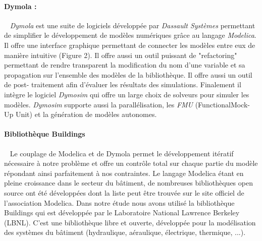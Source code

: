 \paragraph{Dymola :} %
\label{par:dymola}
~
\textit{Dymola} est une suite de logiciels développée par \textit{Dassault Systèmes} permettant de
simplifier le développement de modèles numériques grâce au langage \textit{Modelica}. Il offre une
interface graphique permettant de connecter les modèles entre eux de manière intuitive
(Figure 2). Il offre aussi un outil puissant de "refactoring" permettant de rendre
transparent la modification du nom d’une variable et sa propagation sur l’ensemble
des modèles de la bibliothèque. Il offre aussi un outil de post-
traitement afin d’évaluer les résultats des simulations. Finalement il intègre le logiciel
\textit{Dymosim} qui offre un large choix de solveurs pour simuler les modèles. \textit{Dymosim} supporte
aussi la parallélisation, les \emph{FMU} (FunctionalMock-Up Unit) et la génération de modèles
autonomes.

\paragraph{Bibliothèque Buildings} %
\label{par:bibliotheque_buildings}
~
Le couplage de Modelica et de Dymola permet le développement itératif nécessaire à notre
problème et offre un contrôle total sur chaque partie du modèle répondant ainsi
parfaitement à nos contraintes. Le langage Modelica étant en pleine croissance dans le
secteur du bâtiment, de nombreuses bibliothèques open source ont été développées dont la
liste peut être trouvée sur le site officiel de l’association Modelica. Dans notre étude
nous avons utilisé la bibliothèque Buildings qui est développée par le Laboratoire
National Lawrence Berkeley (LBNL). C’est une bibliothèque libre et ouverte, développée
pour la modélisation des systèmes du bâtiment (hydraulique, aéraulique, électrique,
thermique, ...).





